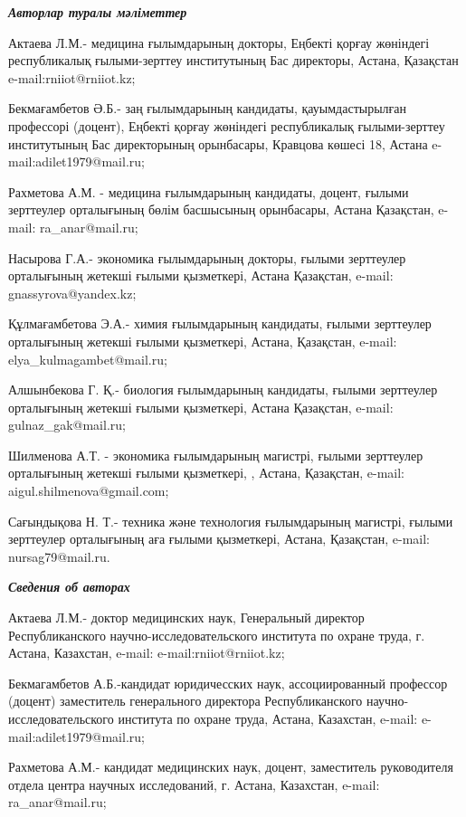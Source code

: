 \begin{info}
\hspace{1em}\emph{{\bfseries Авторлар туралы мәліметтер}}

Актаева Л.М.- медицина ғылымдарының докторы, Еңбекті қорғау жөніндегі
республикалық ғылыми-зерттеу институтының Бас директоры, Астана,
Қазақстан e-mail:rniiot@rniiot.kz;

Бекмағамбетов Ә.Б.- заң ғылымдарының кандидаты, қауымдастырылған
профессорі (доцент), Еңбекті қорғау жөніндегі республикалық
ғылыми-зерттеу институтының Бас директорының орынбасары, Кравцова көшесі
18, Астана e-mail:adilet1979@mail.ru;

Рахметова А.М. - медицина ғылымдарының кандидаты, доцент, ғылыми
зерттеулер орталығының бөлім басшысының орынбасары, Астана Қазақстан,
e-mail: ra\_anar@mail.ru;

Насырова Г.А.- экономика ғылымдарының докторы, ғылыми зерттеулер
орталығының жетекші ғылыми қызметкері, Астана Қазақстан, e-mail:
gnassyrova@yandex.kz;

Құлмағамбетова Э.А.- химия ғылымдарының кандидаты, ғылыми зерттеулер
орталығының жетекші ғылыми қызметкері, Астана, Қазақстан, e-mail:
elya\_kulmagambet@mail.ru;

Алшынбекова Г. Қ.- биология ғылымдарының кандидаты, ғылыми зерттеулер
орталығының жетекші ғылыми қызметкері, Астана Қазақстан, e-mail:
gulnaz\_gak@mail.ru;

Шилменова А.Т. - экономика ғылымдарының магистрі, ғылыми зерттеулер
орталығының жетекші ғылыми қызметкері, , Астана, Қазақстан, e-mail:
aigul.shilmenova@gmail.com;

Сағындықова Н. Т.- техника және технология ғылымдарының магистрі, ғылыми
зерттеулер орталығының аға ғылыми қызметкері, Астана, Қазақстан, e-mail:
nursag79@mail.ru.

\hspace{1em}\emph{{\bfseries Сведения об авторах}}

Актаева Л.М.- доктор медицинских наук, Генеральный директор
Республиканского научно-исследовательского института по охране труда, г.
Астана, Казахстан, e-mail: e-mail:rniiot@rniiot.kz;

Бекмагамбетов А.Б.-кандидат юридичесских наук, ассоциированный профессор
(доцент) заместитель генерального директора Республиканского
научно-исследовательского института по охране труда, Астана, Казахстан,
e-mail: e-mail:adilet1979@mail.ru;

Рахметова А.М.- кандидат медицинских наук, доцент, заместитель
руководителя отдела центра научных исследований, г. Астана, Казахстан,
e-mail: ra\_anar@mail.ru;


\end{info}
